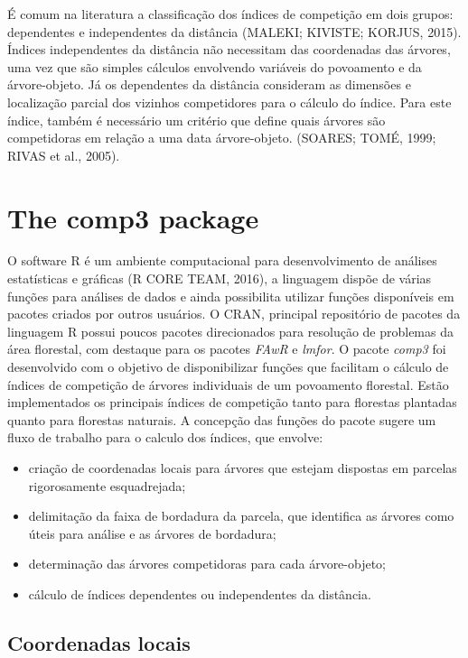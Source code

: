 \documentclass[article]{jss}
\begin{document}
É comum na literatura a classificação dos índices de competição em dois
grupos: dependentes e independentes da distância (MALEKI; KIVISTE;
KORJUS, 2015). Índices independentes da distância não necessitam das
coordenadas das árvores, uma vez que são simples cálculos envolvendo
variáveis do povoamento e da árvore-objeto. Já os dependentes da
distância consideram as dimensões e localização parcial dos vizinhos
competidores para o cálculo do índice. Para este índice, também é
necessário um critério que define quais árvores são competidoras em
relação a uma data árvore-objeto. (SOARES; TOMÉ, 1999; RIVAS et al.,
2005).

\section{The comp3 package}\label{the-comp3-package}

O software R é um ambiente computacional para desenvolvimento de
análises estatísticas e gráficas (R CORE TEAM, 2016), a linguagem dispõe
de várias funções para análises de dados e ainda possibilita utilizar
funções disponíveis em pacotes criados por outros usuários. O CRAN,
principal repositório de pacotes da linguagem R possui poucos pacotes
direcionados para resolução de problemas da área florestal, com destaque
para os pacotes \emph{FAwR} e \emph{lmfor}. O pacote \emph{comp3} foi
desenvolvido com o objetivo de disponibilizar funções que facilitam o
cálculo de índices de competição de árvores individuais de um povoamento
florestal. Estão implementados os principais índices de competição tanto
para florestas plantadas quanto para florestas naturais. A concepção das
funções do pacote sugere um fluxo de trabalho para o calculo dos
índices, que envolve:

\begin{itemize}
\item
  criação de coordenadas locais para árvores que estejam dispostas em
  parcelas rigorosamente esquadrejada;
\item
  delimitação da faixa de bordadura da parcela, que identifica as
  árvores como úteis para análise e as árvores de bordadura;
\item
  determinação das árvores competidoras para cada árvore-objeto;
\item
  cálculo de índices dependentes ou independentes da distância.
\end{itemize}

\subsection{Coordenadas locais}\label{coordenadas-locais}
\end{document}
